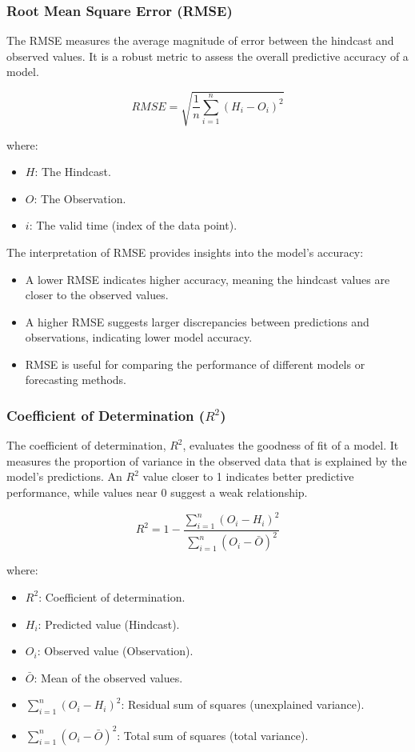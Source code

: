 \subsubsection{Root Mean Square Error (RMSE)}

The RMSE measures the average magnitude of error between the hindcast and observed values. It is a robust metric to assess the overall predictive accuracy of a model. 

\[
RMSE = \sqrt{\frac{1}{n} \sum_{i=1}^{n}(H_i - O_i)^2}
\]

where:  
\begin{itemize}
    \item \( H \): The Hindcast.  
    \item \( O \): The Observation.  
    \item \( i \): The valid time (index of the data point).  
\end{itemize}


The interpretation of RMSE provides insights into the model's accuracy:  
\begin{itemize}
    \item A lower RMSE indicates higher accuracy, meaning the hindcast values are closer to the observed values.  
    \item A higher RMSE suggests larger discrepancies between predictions and observations, indicating lower model accuracy.  
    \item RMSE is useful for comparing the performance of different models or forecasting methods.  
\end{itemize}


\subsubsection{Coefficient of Determination (\( R^2 \))}
The coefficient of determination, \( R^2 \), evaluates the goodness of fit of a model. It measures the proportion of variance in the observed data that is explained by the model's predictions. An \( R^2 \) value closer to 1 indicates better predictive performance, while values near 0 suggest a weak relationship. 

\[
R^2 = 1 - \frac{\sum_{i=1}^n (O_i - H_i)^2}{\sum_{i=1}^n (O_i - \bar{O})^2}
\]

where:  
\begin{itemize}
    \item \( R^2 \): Coefficient of determination.  
    \item \( H_i \): Predicted value (Hindcast).  
    \item \( O_i \): Observed value (Observation).  
    \item \( \bar{O} \): Mean of the observed values.  
    \item \( \sum_{i=1}^n (O_i - H_i)^2 \): Residual sum of squares (unexplained variance).  
    \item \( \sum_{i=1}^n (O_i - \bar{O})^2 \): Total sum of squares (total variance).  
\end{itemize}

